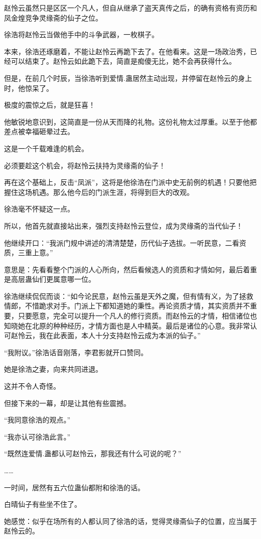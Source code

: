 \begin{this_body}
赵怜云虽然只是区区一个凡人，但自从继承了盗天真传之后，的确有资格有资历和凤金煌竞争灵缘斋的仙子之位。

徐浩将赵怜云当做他手中的斗争武器，一枚棋子。

本来，徐浩还琢磨着，不能让赵怜云再跪下去了。在他看来。这是一场政治秀，已经可以结束了。赵怜云如此跪下去，简直是痴傻无比，她不会再获得什么。

但是，在前几个时辰，当徐浩听到爱情.蛊居然主动出现，并停留在赵怜云的身上时，他惊呆了。

极度的震惊之后，就是狂喜！

他敏锐地意识到，这简直是一份从天而降的礼物。这份礼物太过厚重。以至于他都差点被幸福砸晕过去。

这是一个千载难逢的机会。

必须要趁这个机会，将赵怜云扶持为灵缘斋的仙子！

再在这个基础上，反击“凤派”，这将是他徐浩在门派中史无前例的机遇！只要他把握住这场机遇。那么他今后的门派生涯，将得到巨大的改观。

徐浩毫不怀疑这一点。

所以，他首先就直接站出来，强烈支持赵怜云登位，成为灵缘斋的当代仙子！

他继续开口：“我派门规中讲述的清清楚楚，历代仙子选拔。一听民意，二看资质，三重上意。”

意思是：先看看整个门派的人心所向，然后看候选人的资质和才情如何，最后着重是高层蛊仙们更属意哪一位。

徐浩继续侃侃而谈：“如今论民意，赵怜云虽是天外之魔，但有情有义，为了拯救情郎，不惜跪求对手。门派上下都知道她的秉性。再论资质才情，其实资质并不重要，只要愿意，完全可以提升一个凡人的修行资质。而赵怜云的才情，相信诸位也知晓她在北原的种种经历，才情方面也是人中精英。最后是诸位的心意。我非常认可赵怜云，我在此表面，本人十分支持赵怜云成为本派的仙子。”

“我附议。”徐浩话音刚落，李君影就开口赞同。

她是徐浩之妻，向来共同进退。

这并不令人奇怪。

但接下来的一幕，却是让其他有些震撼。

“我同意徐浩的观点。”

“我亦认可徐浩此言。”

“既然连爱情.蛊都认可赵怜云，那我还有什么可说的呢？”

……

一时间，居然有五六位蛊仙都附和徐浩的话。

白晴仙子有些坐不住了。

她感觉：似乎在场所有的人都认同了徐浩的话，觉得灵缘斋仙子的位置，应当属于赵怜云的。


\end{this_body}
